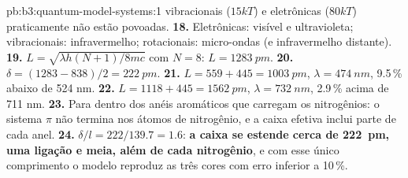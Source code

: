 \begin{solution}{pb:b3:quantum-model-systems:1}
vibracionais ($15kT$) e eletrônicas ($80kT$) praticamente não estão povoadas.
\textbf{18.} Eletrônicas: visível e ultravioleta; vibracionais: infravermelho;
rotacionais: micro-ondas (e infravermelho distante).
\textbf{19.} $L = \sqrt{\lambda h(N+1)/8mc}$ com $N = 8$: $L = \qty{1283}{pm}$.
\textbf{20.} $\delta = (1283 - 838)/2 = \qty{222}{pm}$.
\textbf{21.} $L = 559 + 445 = \qty{1003}{pm}$, $\lambda = \qty{474}{nm}$, 9.5\,\%
abaixo de 524 nm.
\textbf{22.} $L = 1118 + 445 = \qty{1562}{pm}$, $\lambda = \qty{732}{nm}$, 2.9\,\%
acima de 711 nm.
\textbf{23.} Para dentro dos anéis aromáticos que carregam os nitrogênios: o
sistema $\pi$ não termina nos átomos de nitrogênio, e a caixa efetiva inclui
parte de cada anel.
\textbf{24.} $\delta/l = 222/139.7 = 1.6$: \textbf{a caixa se estende cerca de
\qty{222}{pm}, uma ligação e meia, além de cada nitrogênio}, e com esse único
comprimento o modelo reproduz as três cores com erro inferior a 10\,\%.
\end{solution}
